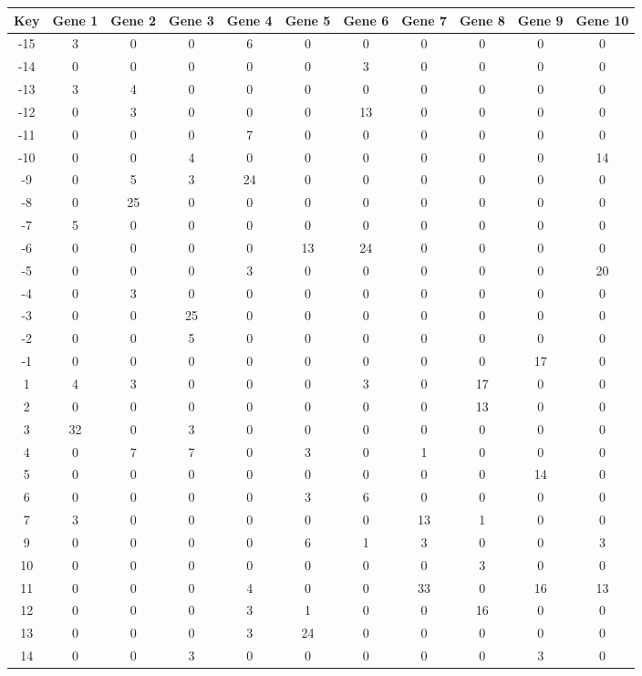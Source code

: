 \begin{tabular}{|c|c|c|c|c|c|c|c|c|c|c|}
\hline
Key & Gene 1 & Gene 2 & Gene 3 & Gene 4 & Gene 5 & Gene 6 & Gene 7 & Gene 8 & Gene 9 & Gene 10 \\
\hline
-15 & 3 & 0 & 0 & 6 & 0 & 0 & 0 & 0 & 0 & 0 \\
-14 & 0 & 0 & 0 & 0 & 0 & 3 & 0 & 0 & 0 & 0 \\
-13 & 3 & 4 & 0 & 0 & 0 & 0 & 0 & 0 & 0 & 0 \\
-12 & 0 & 3 & 0 & 0 & 0 & 13 & 0 & 0 & 0 & 0 \\
-11 & 0 & 0 & 0 & 7 & 0 & 0 & 0 & 0 & 0 & 0 \\
-10 & 0 & 0 & 4 & 0 & 0 & 0 & 0 & 0 & 0 & 14 \\
-9 & 0 & 5 & 3 & 24 & 0 & 0 & 0 & 0 & 0 & 0 \\
-8 & 0 & 25 & 0 & 0 & 0 & 0 & 0 & 0 & 0 & 0 \\
-7 & 5 & 0 & 0 & 0 & 0 & 0 & 0 & 0 & 0 & 0 \\
-6 & 0 & 0 & 0 & 0 & 13 & 24 & 0 & 0 & 0 & 0 \\
-5 & 0 & 0 & 0 & 3 & 0 & 0 & 0 & 0 & 0 & 20 \\
-4 & 0 & 3 & 0 & 0 & 0 & 0 & 0 & 0 & 0 & 0 \\
-3 & 0 & 0 & 25 & 0 & 0 & 0 & 0 & 0 & 0 & 0 \\
-2 & 0 & 0 & 5 & 0 & 0 & 0 & 0 & 0 & 0 & 0 \\
-1 & 0 & 0 & 0 & 0 & 0 & 0 & 0 & 0 & 17 & 0 \\
1 & 4 & 3 & 0 & 0 & 0 & 3 & 0 & 17 & 0 & 0 \\
2 & 0 & 0 & 0 & 0 & 0 & 0 & 0 & 13 & 0 & 0 \\
3 & 32 & 0 & 3 & 0 & 0 & 0 & 0 & 0 & 0 & 0 \\
4 & 0 & 7 & 7 & 0 & 3 & 0 & 1 & 0 & 0 & 0 \\
5 & 0 & 0 & 0 & 0 & 0 & 0 & 0 & 0 & 14 & 0 \\
6 & 0 & 0 & 0 & 0 & 3 & 6 & 0 & 0 & 0 & 0 \\
7 & 3 & 0 & 0 & 0 & 0 & 0 & 13 & 1 & 0 & 0 \\
9 & 0 & 0 & 0 & 0 & 6 & 1 & 3 & 0 & 0 & 3 \\
10 & 0 & 0 & 0 & 0 & 0 & 0 & 0 & 3 & 0 & 0 \\
11 & 0 & 0 & 0 & 4 & 0 & 0 & 33 & 0 & 16 & 13 \\
12 & 0 & 0 & 0 & 3 & 1 & 0 & 0 & 16 & 0 & 0 \\
13 & 0 & 0 & 0 & 3 & 24 & 0 & 0 & 0 & 0 & 0 \\
14 & 0 & 0 & 3 & 0 & 0 & 0 & 0 & 0 & 3 & 0 \\
\hline
\end{tabular}